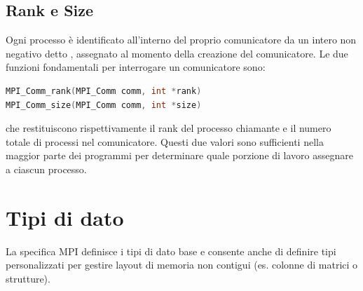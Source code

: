 \subsection{Rank e Size}
Ogni processo è identificato all'interno del proprio comunicatore da un intero non negativo detto , assegnato al momento della creazione del comunicatore. Le due funzioni fondamentali per interrogare un comunicatore sono:
\begin{lstlisting}[language=C, numbers=none]
MPI_Comm_rank(MPI_Comm comm, int *rank)
MPI_Comm_size(MPI_Comm comm, int *size)
\end{lstlisting}
che restituiscono rispettivamente il rank del processo chiamante e il numero totale di processi nel comunicatore. Questi due valori sono sufficienti nella maggior parte dei programmi per determinare quale porzione di lavoro assegnare a ciascun processo.

\section{Tipi di dato}
La specifica MPI definisce i tipi di dato base e consente anche di definire tipi personalizzati per gestire layout di memoria non contigui (es. colonne di matrici o strutture).

